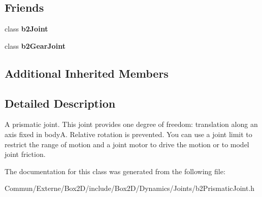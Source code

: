 \subsection*{Friends}
\begin{DoxyCompactItemize}
\item 
class {\bfseries b2\+Joint}\hypertarget{classb2_prismatic_joint_a54ade8ed3d794298108d7f4c4e4793fa}{}\label{classb2_prismatic_joint_a54ade8ed3d794298108d7f4c4e4793fa}

\item 
class {\bfseries b2\+Gear\+Joint}\hypertarget{classb2_prismatic_joint_a13c275221e30bb485e17e4e04553cb71}{}\label{classb2_prismatic_joint_a13c275221e30bb485e17e4e04553cb71}

\end{DoxyCompactItemize}
\subsection*{Additional Inherited Members}


\subsection{Detailed Description}
A prismatic joint. This joint provides one degree of freedom\+: translation along an axis fixed in bodyA. Relative rotation is prevented. You can use a joint limit to restrict the range of motion and a joint motor to drive the motion or to model joint friction. 

The documentation for this class was generated from the following file\+:\begin{DoxyCompactItemize}
\item 
Commun/\+Externe/\+Box2\+D/include/\+Box2\+D/\+Dynamics/\+Joints/b2\+Prismatic\+Joint.\+h\end{DoxyCompactItemize}
